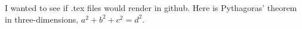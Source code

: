 I wanted to see if .tex files would render in github. Here is Pythagoras' theorem in three-dimensions, $a^2+b^2+c^2=d^2$.
